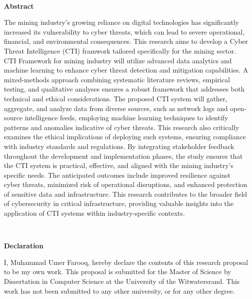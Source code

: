 \documentclass[a4paper,twoside,12pt]{report}
\renewenvironment{abstract}{\ \vfill\begin{center}\textbf{Abstract}\end{center}\addcontentsline{toc}{section}{Abstract}}{\vfill\vfill\newpage}
\newenvironment{declaration}{\ \vfill\begin{center}\textbf{Declaration}\end{center}\addcontentsline{toc}{section}{Declaration}}{\vfill\vfill\newpage}
\begin{document}
\begin{abstract}
The mining industry's growing reliance on digital technologies has significantly increased its vulnerability to cyber threats, which can lead to severe operational, financial, and environmental consequences. This research aims to develop a Cyber Threat Intelligence (CTI) framwork tailored specifically for the mining sector. CTI Framework for mining industry will utilize advanced data analytics and machine learning to enhance cyber threat detection and mitigation capabilities. A mixed-methods approach combining systematic literature reviews, empirical testing, and qualitative analyses ensures a robust framework that addresses both technical and ethical considerations. The proposed CTI system will gather, aggregate, and analyze data from diverse sources, such as network logs and open-source intelligence feeds, employing machine learning techniques to identify patterns and anomalies indicative of cyber threats. This research also critically examines the ethical implications of deploying such systems, ensuring compliance with industry standards and regulations. By integrating stakeholder feedback throughout the development and implementation phases, the study ensures that the CTI system is practical, effective, and aligned with the mining industry’s specific needs. The anticipated outcomes include improved resilience against cyber threats, minimized risk of operational disruptions, and enhanced protection of sensitive data and infrastructure. This research contributes to the broader field of cybersecurity in critical infrastructure, providing valuable insights into the application of CTI systems within industry-specific contexts.
\end{abstract}

\begin{declaration}
I, Muhammad Umer Farooq, hereby declare the contents of this research proposal to be my own work.
This proposal is submitted for the Master of Science by Dissertation in Computer Science at the University of the Witwatersrand.
This work has not been submitted to any other university, or for any other degree.
\end{declaration}
\end{document}
